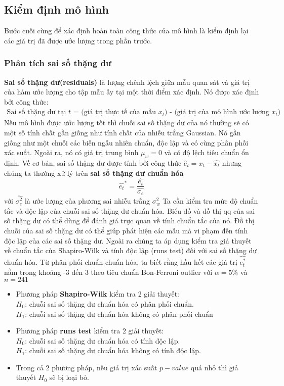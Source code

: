 \subsection{Kiểm định mô hình}
Bước cuối cùng để xác định hoàn toàn công thức của mô hình là kiểm định lại các giá trị đã được ước lượng trong phần trước.
\subsubsection{Phân tích sai số thặng dư}
\textbf{Sai số thặng dư(residuals)} là lượng chênh lệch giữa mẫu quan sát và giá trị của hàm ước lượng cho tập mẫu ấy tại một thời điểm xác định. Nó được xác định bởi công thức:
\begin{align}
	\text{Sai số thặng dư tại $t$ = (giá trị thực tế của mẫu $x_t$) - (giá trị của mô hình ước lượng $x_t$)}
\end{align}
Nếu mô hình được ước lượng tốt thì chuỗi sai số thặng dư của nó thường sẽ có một số tính chất gần giống như tính chất của nhiễu trắng Gaussian. Nó gần giống như một chuỗi các biến ngẫu nhiên chuẩn, độc lập và có cùng phân phối xác suất. Ngoài ra, nó có giá trị trung bình $\mu_w = 0$ và có độ lệch tiêu chuẩn ổn định. 
Về cơ bản, sai số thặng dư được tính bởi công thức $\hat{e}_t = x_t - \hat{x_t}$ nhưng chúng ta thường xử lý trên \textbf{sai số thặng dư chuẩn hóa} 
\begin{equation}
	\hat{e_t}^* = \frac{\hat{e_t}}{\hat{\sigma_e}}
\end{equation}
với $\hat{\sigma^2_e}$ là ước lượng của phương sai nhiễu trắng $\sigma_w^2$
Ta cần kiểm tra mức độ chuẩn tắc và độc lập của chuỗi sai số thặng dư chuẩn hóa. 
Biểu đồ và đồ thị qq của sai số thặng dư có thể dùng để đánh giá trực quan về tính chuẩn tắc của nó. Đồ thị chuỗi của sai số thặng dư có thể giúp phát hiện các mẫu mà vi phạm đến tính độc lập của các sai số thặng dư. Ngoài ra chúng ta áp dụng kiểm tra giả thuyết về chuẩn tắc của Shapiro-Wilk \citep{sw65} và tính độc lập (runs test) đối với sai số thặng dư chuẩn hóa. Từ phân phối chuẩn chuẩn hóa, ta biết rằng hầu hết các giá trị $\hat{e_t^*}$ nằm trong khoảng -3 đến 3 theo tiêu chuẩn  Bon-Ferroni outlier với $\alpha = 5\%$ và $n =241$
\begin{itemize}
\item Phương pháp \textbf{Shapiro-Wilk} kiểm tra 2 giải thuyết:\\
	 $H_0$: chuỗi sai số thặng dư chuẩn hóa có phân phối chuẩn.\\
	$H_1$: chuỗi sai số thặng dư chuẩn hóa không có phân phối chuẩn
	\item Phương pháp \textbf{runs test} kiểm tra 2 giải thuyết:\\
	$H_0$: chuỗi sai số thặng dư chuẩn hóa có tính độc lập.\\
	$H_1$: chuỗi sai số thặng dư chuẩn hóa không có tính độc lập.
	\item Trong cả 2 phương pháp, nếu giá trị xác suất $p-value$ quá nhỏ thì giả thuyết $H_0$ sẽ bị loại bỏ.
\end{itemize}

